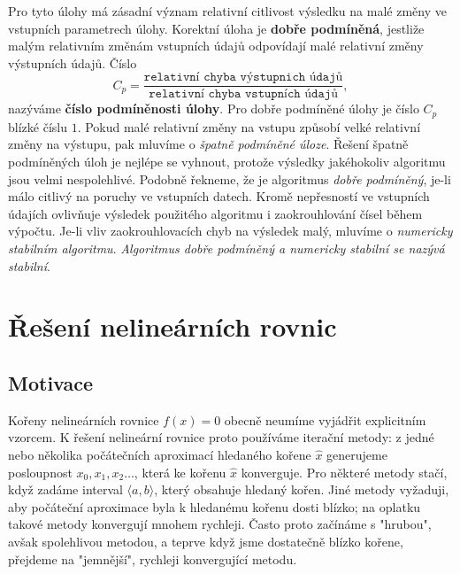       Pro tyto úlohy má zásadní význam relativní citlivost výsledku na malé změny ve vstupních
      parametrech úlohy. Korektní úloha je \textbf{dobře pod\-mí\-ně\-ná}, jestliže malým
      relativním změnám vstupních údajů odpovídají malé relativní změny výstupních údajů. Číslo
      \begin{equation}\label{nm:eq_podminenost}
        C_p=\frac{\texttt{relativní chyba výstupnich údajů}}{\texttt{relativní chyba vstupních
            údajů}},
      \end{equation}
      nazýváme \textbf{číslo podmíněnosti úlohy}. Pro dobře podmíněné úlohy je číslo $C_p$ blízké
      číslu $1$. Pokud malé relativní změny na vstupu způsobí velké relativní změny na výstupu, pak
      mluvíme o \emph{špatně podmíněné úloze}. Řešení špatně podmíněných úloh je nejlépe se
      vyhnout, protože výsledky jakéhokoliv algoritmu jsou velmi nespolehlivé. Podobně řekneme, že
      je algoritmus \emph{dobře pod\-mí\-ně\-ný}, je-li málo citlivý na poruchy ve vstupních
      datech. Kromě ne\-přes\-ností ve vstupních údajích ovlivňuje výsledek použitého algoritmu i
      zaokrouhlování čísel během výpočtu. Je-li vliv zaokrouhlovacích chyb na výsledek malý,
      mluvíme o \emph{numericky stabilním algoritmu}. \emph{Algoritmus dobře pod\-mí\-ně\-ný a
      numericky stabilní se nazývá stabilní}.

\section{Řešení nelineárních rovnic}
  \subsection{Motivace}
    Kořeny nelineárních rovnice $f(x)=0$ obecně neumíme vyjádřit explicitním vzorcem. K řešení
    nelineární rovnice proto používáme iterační metody: z jedné nebo několika počátečních
    aproximací hledaného kořene $\hat{x}$ generujeme posloupnost $x_0,x_1,x_2…$, která ke kořenu
    $\hat{x}$ konverguje. Pro některé metody stačí, když zadáme interval $\langle a,b\rangle$,
    který obsahuje hledaný kořen. Jiné metody vyžaduji, aby počáteční aproximace byla k hledanému
    kořenu dosti blízko; na oplatku takové metody konvergují mnohem rychleji. Často proto začínáme
    s "hrubou", avšak spolehlivou metodou, a teprve když jsme dostatečně blízko kořene, přejdeme na
    "jemnější", rychleji konvergující metodu.

